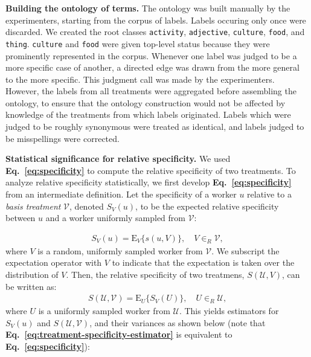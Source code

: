 \documentclass[a4paper]{report}
\begin{document}
\textbf{Building the ontology of terms.}  The ontology was built manually
by the experimenters, starting from the corpus of labels. Labels occuring only 
once were discarded.  We created the root classes \texttt{activity}, 
\texttt{adjective}, \texttt{culture}, 
\texttt{food}, and \texttt{thing}. \texttt{culture} and \texttt{food} were 
given top-level status because they were prominently represented in the corpus.
Whenever one label was judged to be a more specific case of another, a
directed edge was drawn from the more general to the more specific. This
judgment call was made by the experimenters.  However, the labels from all 
treatments were aggregated before assembling the ontology,  to 
ensure that the ontology construction would not be affected by 
knowledge of the treatments from which labels originated. 
Labels which were judged to be roughly synonymous were treated as identical,
and labels judged to be misspellings were corrected. 

\textbf{Statistical significance for relative specificity.}
We used \textbf{Eq.~\ref{eq:specificity}} to compute the relative specificity
of two treatments.  To analyze relative specificity statistically,
we first develop \textbf{Eq.~\ref{eq:specificity}} from an intermediate 
definition.  Let the specificity of a worker $u$ relative to a 
\textit{basis treatment} $\mathcal{V}$, denoted $S_V(u)$, to be the expected 
relative specificity between $u$ and a worker uniformly sampled from 
$\mathcal{V}$:

\begin{align}
	S_V(u) =  \text{E}_V\{s(u,V)\}, \quad V \in_R \mathcal{V},
		\label{eq:basis-specificity}
\end{align}
where $V$ is a random, uniformly sampled worker from $\mathcal{V}$.  We 
subscript the expectation operator with $V$ to indicate 
that the expectation is taken over the distribution of $V$.  Then, the relative specificity of two treatmens, $S(\mathcal{U},{V})$, can be 
written as:
\begin{align}
	S(\mathcal{U},\mathcal{V}) = 
		\text{E}_U\{S_V(U)\}, \quad U \in_R \mathcal{U},
		\label{eq:treatment-specificity}
\end{align}
where $U$ is a uniformly sampled worker from $\mathcal{U}$.  This yields 
estimators for $S_V(u)$ and $S(\mathcal{U}, \mathcal{V})$, and their variances
as shown below (note that 
\textbf{Eq.~\ref{eq:treatment-specificity-estimator}} is
equivalent to \textbf{Eq.~\ref{eq:specificity}}):
\end{document}
